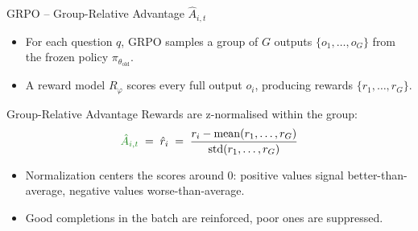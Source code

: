 \documentclass[9pt]{beamer}
\begin{document}
\begin{frame}{GRPO – Group-Relative Advantage $\hat{A}_{i,t}$}
  \begin{itemize}\setlength\itemsep{0.4em}

    \item For each question $q$, GRPO samples a group of $G$ outputs
          $\{o_1,\dots,o_G\}$ from the frozen policy $\pi_{\theta_{\text{old}}}$.

    \item A reward model $R_\varphi$ scores every full output $o_i$,
          producing rewards $\{r_1,\dots,r_G\}$.

  \end{itemize}

  \begin{block}{Group-Relative Advantage}
    Rewards are z-normalised within the group:
    \begin{equation}
      \textcolor{ForestGreen}{\hat{A}_{i,t}}\;=\;\hat{r}_i\;=\;
      \frac{r_i-\operatorname{mean}(r_1,\dots,r_G)}
           {\operatorname{std}(r_1,\dots,r_G)}
      \label{eq:grpo_adv}
    \end{equation}
   \pause
  \begin{itemize}\setlength\itemsep{0.4em}
    \item Normalization centers the scores around $0$: positive values
          signal better-than-average, negative values worse-than-average.

    \item Good completions in the batch are reinforced, poor ones are suppressed.
  \end{itemize}
  \end{block}

  \vspace{0.6em}

\end{frame}
\end{document}
